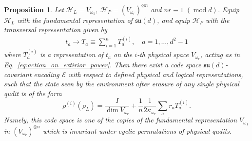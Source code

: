 \documentclass[11pt,letterpaper]{article}
\theoremstyle{plain}
\theoremstyle{plain}
\theoremstyle{plain}
\theoremstyle{plain}
\theoremstyle{plain}
\theoremstyle{plain}
\theoremstyle{plain}
\newtheorem{smproposition}[smtheorem]{Proposition}
\theoremstyle{definition}
\theoremstyle{plain}
\begin{document}
\begin{smproposition}\label{prop:SUdcov}
    Let
    $
        \mathcal H_L=V_{\omega_1},\;
        \mathcal H_P=(V_{\omega_r})^{\otimes n}
    $
    and $nr\equiv 1\;(\operatorname{mod} d)$.
    Equip \(\mathcal H_L\) with the fundamental representation of
    \(\mathfrak{su}(d)\), and equip \(\mathcal H_P\) with the transversal
    representation given by
    \begin{equation}
    \begin{gathered}
    t_a \rightarrow T_a \equiv \sum_{i=1}^n T_a^{(i)}, \quad a=1,\ldots,d^2-1
    \end{gathered}
    \end{equation}
    where $T_a^{(i)}$ is a representation of $t_a$ on the $i$-th physical space $V_{\omega_r}$, acting as in Eq.~\eqref{eq:action_on_extirior_power}.
    Then there exist a code space $\mathfrak{su}(d)$-covariant encoding $\mathcal{E}$ with respect to defined physical and logical representations, 
    such that the state seen by the environment after erasure of any single physical qudit is of the form   
    \[
        \rho^{(i)}\left(\rho_L\right)=\frac{I}{\operatorname{dim} V_{\omega_r}}+\frac{1}{n} \frac{1}{2\kappa_{\omega_r}} \sum_a r_a T_a^{(i)} .    
    \]
    Namely, this code space is one of the copies of the fundamental representation $V_{\omega_1}$ in $\left(V_{\omega_r}\right)^{\otimes n}$ 
    which is invariant under cyclic permutations of physical qudits.
\end{smproposition}
\end{document}
